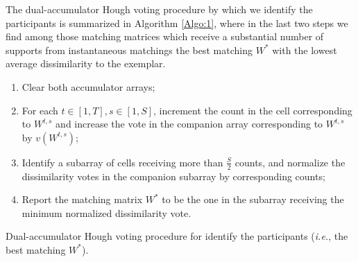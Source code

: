 The dual-accumulator Hough voting procedure by which we identify the participants is summarized in Algorithm \ref{Algo:1}, where in the last two steps we find among those matching matrices which receive a substantial number of supports from instantaneous matchings the best matching $W^{*}$ with the lowest average dissimilarity to the exemplar.
\begin{algorithm}
\footnotesize{
\begin{enumerate}
\item Clear both accumulator arrays;
\item For each $t\in[1,T], s\in[1,S]$, increment the count in the cell corresponding to $W^{t,s}$ and increase the vote in the companion array corresponding to $W^{t,s}$ by $v(W^{t,s})$;
\item Identify a subarray of cells receiving more than $\frac{S}{2}$ counts, and normalize the dissimilarity votes in the companion subarray by corresponding counts;
\item Report the matching matrix $W^{*}$ to be the one in the subarray receiving the minimum normalized dissimilarity vote.
\end{enumerate}
}
\caption{\small Dual-accumulator Hough voting procedure for identify the participants (\textit{i.e.}, the best matching $W^{*}$).}
\label{Algo:1}
\end{algorithm}

